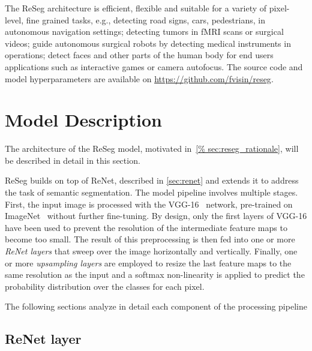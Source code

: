 The ReSeg architecture is efficient, flexible and suitable for a variety of
pixel-level, fine grained tasks, e.g., detecting road signs, cars, pedestrians,
in autonomous navigation settings; detecting tumors in fMRI scans or surgical
videos; guide autonomous surgical robots by detecting medical instruments in
operations; detect faces and other parts of the human body for end users
applications such as interactive games or camera autofocus.
The source code and model hyperparameters are available on
\href{https://github.com/fvisin/reseg}{https://github.com/fvisin/reseg}.


\section{Model Description}\label{sec:reseg_model}

The architecture of the ReSeg model, motivated in~\autoref{%
sec:reseg_rationale}, will be described in detail in this section.

ReSeg builds on top of ReNet, described in \autoref{sec:renet} and
extends it to address the task of semantic segmentation. The model pipeline
involves multiple stages. First, the input image is processed with the
VGG-16~\citep{Simonyan2015} network, pre-trained on
ImageNet~\citep{imagenet_cvpr09} without further fine-tuning. By design, only
the first layers of VGG-16 have been used to prevent the resolution of the
intermediate feature maps to become too small.  The result of this
preprocessing is then fed into one or more \emph{ReNet layers} that sweep over
the image horizontally and vertically. Finally, one or more \emph{upsampling
layers} are employed to resize the last feature maps to the same resolution as
the input and a softmax non-linearity is applied to predict the probability
distribution over the classes for each pixel.

The following sections analyze in detail each component of the processing
pipeline

\subsection{ReNet layer}


